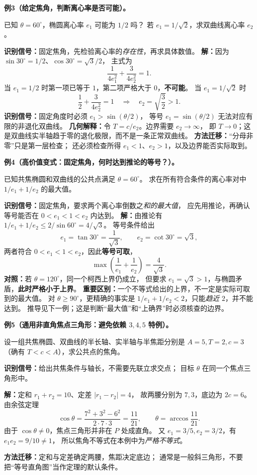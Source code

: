 \clearpage
\begin{examplebox}
\textbf{例3（给定焦角，判断离心率是否可能）。}

已知 $\theta=60^\circ$，椭圆离心率 $e_1$ 可能为 $1/2$ 吗？
若 $e_1=1/\sqrt2$，求双曲线离心率 $e_2$。

\textbf{识别信号：}固定焦角，先检验离心率的\emph{存在性}，再求具体数值。
\textbf{解：}因为 $\sin30^\circ=1/2$、$\cos30^\circ=\sqrt3/2$，
主式为
\[
 \frac{1}{4e_1^2}+\frac{3}{4e_2^2}=1.
\]
当 $e_1=1/2$ 时第一项已等于 $1$，第二项严格大于 $0$，\textbf{不可能}。
当 $e_1=1/\sqrt2$ 时
\[
 \frac12+\frac{3}{4e_2^2}=1
\quad\Longrightarrow\quad \boxed{e_2=\sqrt{\frac32}>1}.
\]
\textbf{识别信号：}固定角度时必须 $e_1>\sin(\theta/2)$，
等号 $e_1=\sin(\theta/2)$ 无法对应有限的非退化双曲线。
\textbf{几何解释：}令 $T=c/e_2$。边界需要 $e_2\to\infty$，
即 $T\to0$；这是双曲线实半轴趋于零的退化极限，而不是一条正常双曲线。
\textbf{方法迁移：}“分母非零”只是第一层检查；
还必须检查所得 $e_1<1$、$e_2>1$，以及边界能否实际取到。
\end{examplebox}

\clearpage
\begin{examplebox}
\textbf{例4（高价值变式：固定焦角，何时达到推论的等号？）。}

已知共焦椭圆和双曲线的公共点满足 $\theta=60^\circ$。
求在所有符合条件的离心率对中 $1/e_1+1/e_2$ 的最大值。

\textbf{识别信号：}固定焦角，要求两个离心率倒数之\emph{和的最大值}，
应先用推论，再确认等号能否在 $0<e_1<1<e_2$ 内达到。
\textbf{解：}由推论有 $1/e_1+1/e_2\le2/\sin60^\circ=4/\sqrt3$。
等号条件给出
\[
 e_1=\tan30^\circ=\frac1{\sqrt3},\qquad
 e_2=\cot30^\circ=\sqrt3,
\]
两者符合 $0<e_1<1<e_2$，因此\textbf{等号可取}，
\[
 \boxed{\max\left(\frac1{e_1}+\frac1{e_2}\right)=\frac4{\sqrt3}}.
\]
\textbf{对照：}若 $\theta=120^\circ$，同一个柯西上界仍成立，
但要求 $e_1=\sqrt3>1$，与椭圆矛盾，\textbf{此时严格小于上界}。
\textbf{重要区别：}一个不等式给出的上界，不一定是实际可取到的最大值。
对 $\theta\ge90^\circ$，更精确的事实是
$1/e_1+1/e_2<2$，只能\emph{趋近} $2$，并不能达到。
推导见下一例；这是判断“最大值”和“上确界”时必须核查的边界。
\end{examplebox}

\clearpage
\begin{examplebox}
\textbf{例5（通用非直角焦点三角形：避免依赖 $3,4,5$ 特例）。}

设一组共焦椭圆、双曲线的半长轴、实半轴与半焦距分别是
$A=5,T=2,c=3$（确有 $T<c<A$），求公共点的焦角。

\textbf{识别信号：}给出共焦条件与轴长，不需要先联立求交点；
目标 $\theta$ 在同一个焦点三角形中。

\textbf{解：}定和 $r_1+r_2=10$、定差 $|r_1-r_2|=4$，
故两腰分别为 $7,3$，底边为 $2c=6$。
由余弦定理
\[
\cos\theta=\frac{7^2+3^2-6^2}{2\cdot7\cdot3}
=\frac{11}{21},\qquad
\boxed{\theta=\arccos\frac{11}{21}}.
\]
由于 $\cos\theta\ne0$，焦点三角形并非在 $P$ 处成直角。
又 $e_1=3/5,e_2=3/2$，有 $e_1e_2=9/10\ne1$，
所以焦角不等式在本例中为\emph{严格不等式}。

\textbf{方法迁移：}定和与定差确定两腰，焦距决定底边；
通常是一般斜三角形，不要把“等号直角图”当作定理的默认条件。
\end{examplebox}

